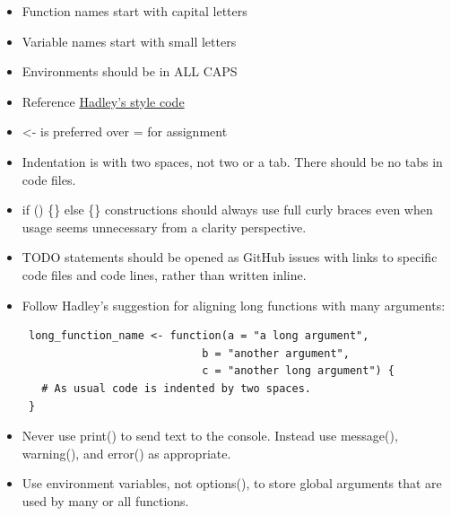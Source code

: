 \documentclass[12pt,]{article}
\begin{document}
\begin{itemize}
\item
  Function names start with capital letters
\item
  Variable names start with small letters
\item
  Environments should be in ALL CAPS
\item
  Reference \href{http://adv-r.had.co.nz/Style.html}{Hadley's style
  code}
\item
  \textless{}- is preferred over = for assignment
\item
  Indentation is with two spaces, not two or a tab. There should be no
  tabs in code files.
\item
  if () \{\} else \{\} constructions should always use full curly braces
  even when usage seems unnecessary from a clarity perspective.
\item
  TODO statements should be opened as GitHub issues with links to
  specific code files and code lines, rather than written inline.
\item
  Follow Hadley's suggestion for aligning long functions with many
  arguments:

\begin{verbatim}
 long_function_name <- function(a = "a long argument", 
                            b = "another argument",
                            c = "another long argument") {
   # As usual code is indented by two spaces.
 }
\end{verbatim}
\item
  Never use print() to send text to the console. Instead use message(),
  warning(), and error() as appropriate.
\item
  Use environment variables, not options(), to store global arguments
  that are used by many or all functions.
\end{itemize}


\end{document}
